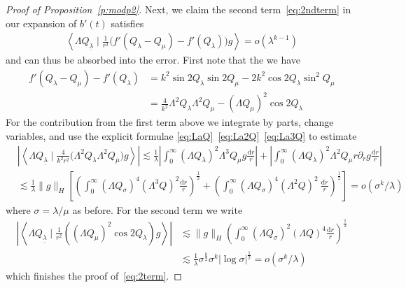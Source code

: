 \documentclass[10pt,reqno]{amsart}
\newcommand{\la}{\lambda}
\newcommand{\s}{\sigma}
\newcommand{\La}{\Lambda}
\newcommand{\p}{\partial}
\newcommand{\ang}[1]{\left\langle{#1}\right\rangle}
\newcommand{\abs}[1]{\left\lvert{#1}\right\rvert}
\newcommand{\EQ}[1]{\begin{equation}\begin{split} #1 \end{split}\end{equation}}
\numberwithin{equation}{section}
\theoremstyle{remark}
\newcounter{parts}
\newcommand{\ula}{\underline{\lambda}}
\newcommand{\ud}{\mathrm{d}}
\newcommand{\0}{\emptyset}
\begin{document}
\begin{proof}[Proof of Proposition~\ref{p:modp2}]
Next, we claim the second term~\eqref{eq:2ndterm} in our expansion of $b'(t)$ satisfies
\EQ{ \label{eq:2term} 
 \ang{ \La Q_{\ula} \mid \frac{1}{r^2} \Big( f'(Q_\la - Q_\mu) - f'(Q_\la) \Big) g}   = o(\la^{k-1})
}
and can thus be absorbed into the error. 
First note that the we have 
\EQ{
 f'(Q_\la - Q_\mu) - f'(Q_\la)& = k^2 \sin 2Q_\la \sin 2Q_\mu -2k^2 \cos 2Q_\la \sin^2Q_\mu \\
&=  \frac{4}{k^2} \La^2 Q_\la \La^2 Q_\mu- (\La Q_\mu)^2\cos 2Q_\la 
}
For the contribution from the first term above we integrate by parts, change variables, and use the explicit formulae \eqref{eq:LaQ}~\eqref{eq:La2Q}~\eqref{eq:La3Q} to estimate 
\EQ{
&\abs{\ang{\La Q_{\ula} \mid \frac{4}{k^2r^2} (\La^2 Q_\la \La^2 Q_\mu \Big)g}} \lesssim \frac{1}{\la} \abs{ \int_0^\infty (\La Q_\la)^2 \La^3 Q_\mu g \frac{\ud r }{r}} + \abs{\int_0^\infty (\La Q_\la)^2 \La^2Q_\mu r \p_r g \frac{\ud r}{r}}\\
& \lesssim \frac{1}{\la}  \| g\|_{H} \left[\left( \int_0^\infty (\La Q_\s)^4 (\La^3 Q)^2 \frac{\ud r}{r} \right)^{\frac{1}{2}} + \left( \int_0^\infty (\La Q_\s)^4 (\La^2 Q)^2 \ \frac{\ud r}{r} \right)^{\frac{1}{2}} \right] = o(\s^{k}/\la)
}
where $\s = \la/ \mu$ as before.  For the second term we write 
\EQ{
\abs{\ang{ \La Q_{\ula} \mid \frac{1}{r^2}( (\La Q_\mu)^2\cos 2Q_\la)  g}} &\lesssim \| g\|_{H} \left( \int_0^\infty  (\La Q_{\s})^2 (\La Q)^4 \frac{ \ud r}{r} \right)^{\frac{1}{2}} \\
& \lesssim \frac{1}{\la} \s^{\frac{k}{2}} \s^k \abs{\log \s}^{\frac{1}{2}}  = o( \s^k/ \la)
}
which finishes the proof of~\eqref{eq:2term}. 


\end{proof}
\end{document}
